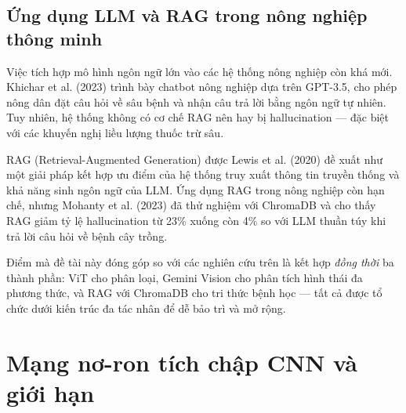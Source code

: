 \subsection{Ứng dụng LLM và RAG trong nông nghiệp thông minh}

Việc tích hợp mô hình ngôn ngữ lớn vào các hệ thống nông nghiệp còn khá mới. Khichar et al. (2023) \cite{khichar2023} trình bày chatbot nông nghiệp dựa trên GPT-3.5, cho phép nông dân đặt câu hỏi về sâu bệnh và nhận câu trả lời bằng ngôn ngữ tự nhiên. Tuy nhiên, hệ thống không có cơ chế RAG nên hay bị hallucination --- đặc biệt với các khuyến nghị liều lượng thuốc trừ sâu.

RAG (Retrieval-Augmented Generation) được Lewis et al. (2020) \cite{lewis2020} đề xuất như một giải pháp kết hợp ưu điểm của hệ thống truy xuất thông tin truyền thống và khả năng sinh ngôn ngữ của LLM. Ứng dụng RAG trong nông nghiệp còn hạn chế, nhưng Mohanty et al. (2023) \cite{mohanty2023} đã thử nghiệm với ChromaDB và cho thấy RAG giảm tỷ lệ hallucination từ 23\% xuống còn 4\% so với LLM thuần túy khi trả lời câu hỏi về bệnh cây trồng.

Điểm mà đề tài này đóng góp so với các nghiên cứu trên là kết hợp \emph{đồng thời} ba thành phần: ViT cho phân loại, Gemini Vision cho phân tích hình thái đa phương thức, và RAG với ChromaDB cho tri thức bệnh học --- tất cả được tổ chức dưới kiến trúc đa tác nhân để dễ bảo trì và mở rộng.

\newpage
\section{Mạng nơ-ron tích chập CNN và giới hạn}


